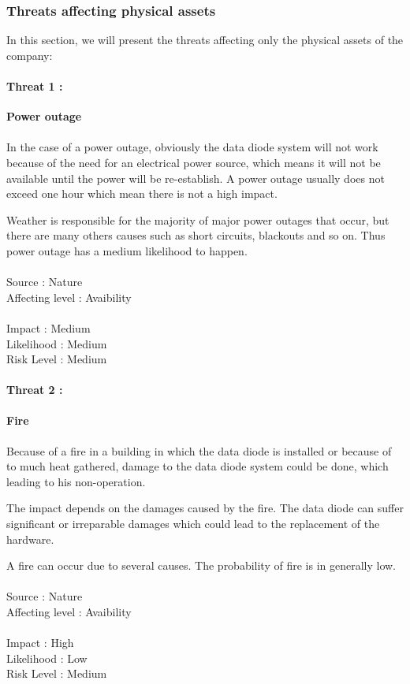 \documentclass[a4paper,10pt]{article}
\begin{document}
\subsubsection{Threats affecting physical assets}
In this section, we will present the threats affecting only the physical assets of the company:


\paragraph{Threat 1 :}  \textbf{Power outage} 
\paragraph{}In the case of a power outage, obviously the data diode system will not work because of the need for an electrical power source, which means it will not be available until the power will be re-establish. A power outage usually does not exceed one hour which mean there is not a high impact.

Weather is responsible for the majority of major power outages that occur, but there are many others causes such as short circuits, blackouts and so on. Thus power outage has a medium likelihood to happen.    \\ \\
Source : Nature \\ 
Affecting level : Avaibility \\ \\
Impact : Medium \\
Likelihood : Medium \\
Risk Level : Medium \\

\paragraph{Threat 2 :}  \textbf{Fire} 
\paragraph{}Because of a fire in a building in which the data diode is installed or because of to much heat gathered, damage to the data diode system could be done, which leading to his non-operation.

The impact depends on the damages caused by the fire. The data diode can suffer significant or irreparable damages which could lead to the replacement of the hardware.

A fire can occur due to several causes. The probability of fire is in generally low.\\ \\
Source : Nature \\ 
Affecting level : Avaibility \\ \\
Impact : High \\
Likelihood : Low \\
Risk Level : Medium
\end{document}
